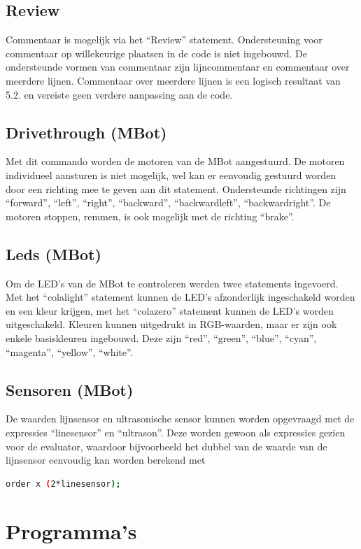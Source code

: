 \documentclass[12pt,a4paper]{report}
\begin{document}
\section{Review}
Commentaar is mogelijk via het ``Review'' statement. Ondersteuning voor commentaar op willekeurige plaatsen in de code is niet ingebouwd. De ondersteunde vormen van commentaar zijn lijncommentaar en commentaar over meerdere lijnen. Commentaar over meerdere lijnen is een logisch resultaat van \textsc{5.2.} en vereiste geen verdere aanpassing aan de code.

\section{Drivethrough (MBot)}
Met dit commando worden de motoren van de MBot aangestuurd. De motoren individueel aansturen is niet mogelijk, wel kan er eenvoudig gestuurd worden door een richting mee te geven aan dit statement. Ondersteunde richtingen zijn ``forward'', ``left'', ``right'', ``backward'', ``backwardleft'', ``backwardright''. De motoren stoppen, remmen, is ook mogelijk met de richting ``brake''.

\section{Leds (MBot)}
Om de LED's van de MBot te controleren werden twee statements ingevoerd. Met het ``colalight'' statement kunnen de LED's afzonderlijk ingeschakeld worden en een kleur krijgen, met het ``colazero'' statement kunnen de LED's worden uitgeschakeld. Kleuren kunnen uitgedrukt in RGB-waarden, maar er zijn ook enkele basiskleuren ingebouwd. Deze zijn ``red'', ``green'', ``blue'', ``cyan'', ``magenta'', ``yellow'', ``white''.

\section{Sensoren (MBot)}
De waarden lijnsensor en ultrasonische sensor kunnen worden opgevraagd met de expressies ``linesensor'' en ``ultrason''. Deze worden gewoon als expressies gezien voor de evaluator, waardoor bijvoorbeeld het dubbel van de waarde van de lijnsensor eenvoudig kan worden berekend met
\begin{lstlisting}[language=Bash]
  order x (2*linesensor);
\end{lstlisting}

\chapter{Programma's}
\end{document}
